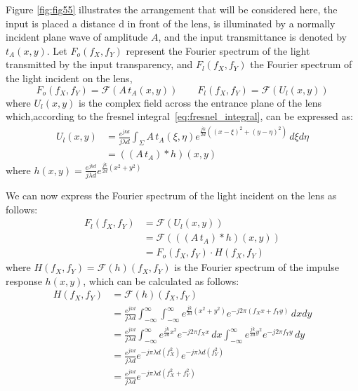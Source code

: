 \documentclass{article}
\begin{document}
Figure \ref{fig:fig55} illustrates the arrangement that will be considered here, the input is placed a distance d in front of the lens, is illuminated by a normally incident plane wave of amplitude $A$, and the input transmittance is denoted by $t_A(x,y)$. Let $F_o(f_X, f_Y)$ represent the Fourier spectrum of the light transmitted by the input transparency, and $F_l(f_X, f_Y)$ the Fourier spectrum of the light incident on the lens,
\begin{equation}
    F_o(f_X, f_Y) = \mathcal{F}(A \, t_A(x,y)) \quad \quad F_l(f_X, f_Y) = \mathcal{F}(U_l(x,y))
\end{equation}
where $U_l(x,y)$ is the complex field across the entrance plane of the lens which,according to the fresnel integral~\cref{eq:fresnel_integral}, can be expressed as:
\begin{align}
    U_l(x,y) &= \frac{e^{jkd}}{j\lambda d}\int_\Sigma A \, t_A(\xi,\eta) e^{\frac{jk}{2d}\left((x-\xi)^2 + (y-\eta)^2\right)} \,d\xi d\eta\\
    &= \left((A\, t_A) \ast h\right) (x,y)
\end{align}
where $h(x,y) = \frac{e^{jkd}}{j\lambda d} e^{\frac{jk}{2d}(x^2 + y^2)}$ 

We can now express the Fourier spectrum of the light incident on the lens as follows:
\begin{align}
    F_l(f_X, f_Y) &= \mathcal{F}(U_l(x,y)) \\
    &= \mathcal{F}\left( \left((A\, t_A) \ast h\right) (x,y) \right) \\
    &= F_o(f_X, f_Y) \cdot H(f_X, f_Y)
\end{align}
where $H(f_X, f_Y) = \mathcal{F}(h)(f_X, f_Y)$ is the Fourier spectrum of the impulse response $h(x,y)$, which can be calculated as follows:
\begin{align}
    H(f_X, f_Y) &= \mathcal{F}(h)(f_X, f_Y) \\
    &= \frac{e^{jkd}}{j\lambda d} \int_{-\infty}^{\infty} \int_{-\infty}^{\infty} e^{\frac{jk}{2d}(x^2 + y^2)} e^{-j2\pi(f_X x + f_Y y)} \, dx dy \\
    &= \frac{e^{jkd}}{j\lambda d} \int_{-\infty}^{\infty} e^{\frac{jk}{2d}x^2} e^{-j2\pi f_X x} \, dx \int_{-\infty}^{\infty} e^{\frac{jk}{2d}y^2} e^{-j2\pi f_Y y} \, dy \\
    &= \frac{e^{jkd}}{j\lambda d} e^{-j \pi \lambda d (f_X^2)} e^{-j \pi \lambda d (f_Y^2)} \\
    &= \frac{e^{jkd}}{j\lambda d} e^{-j \pi \lambda d (f_X^2 + f_Y^2)}
\end{align}
\end{document}
